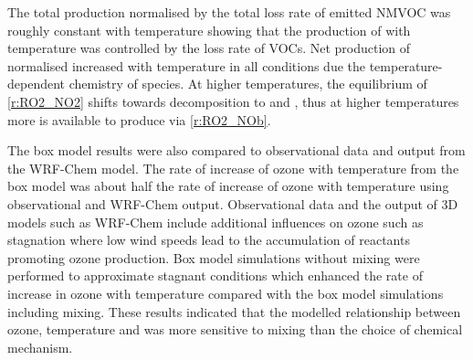 The total  production normalised by the total loss rate of emitted NMVOC was roughly constant with temperature showing that the production of  with temperature was controlled by the loss rate of VOCs.
Net production of normalised  increased with temperature in all  conditions due the temperature-dependent chemistry of  species.
At higher temperatures, the equilibrium of  \eqref{r:RO2_NO2} shifts towards decomposition to  and , thus at higher temperatures more  is available to produce  via \eqref{r:RO2_NOb}.

The box model results were also compared to observational data and output from the WRF-Chem model.
The rate of increase of ozone with temperature from the box model was about half the rate of increase of ozone with temperature using observational and WRF-Chem output.
Observational data and the output of 3D models such as WRF-Chem include additional influences on ozone such as stagnation where low wind speeds lead to the accumulation of reactants promoting ozone production.
Box model simulations without mixing were performed to approximate stagnant conditions which enhanced the rate of increase in ozone with temperature compared with the box model simulations including mixing.
These results indicated that the modelled relationship between ozone, temperature and  was more sensitive to mixing than the choice of chemical mechanism.
